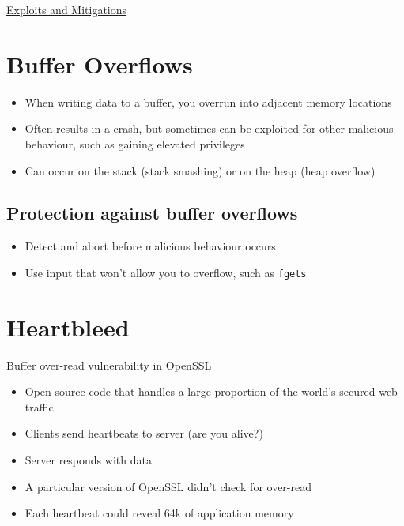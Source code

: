 \documentclass{article}[18pt]
\begin{document}
\begin{center}
\underline{\huge Exploits and Mitigations}
\end{center}

\section{Buffer Overflows}
\begin{itemize}
	\item When writing data to a buffer, you overrun into adjacent memory locations
	\item Often results in a crash, but sometimes can be exploited for other malicious behaviour, such as gaining elevated privileges
	\item Can occur on the stack (stack smashing) or on the heap (heap overflow)
\end{itemize}
\subsection{Protection against buffer overflows}
\begin{itemize}
	\item Detect and abort before malicious behaviour occurs
	\item Use input that won't allow you to overflow, such as \texttt{fgets}
\end{itemize}
\section{Heartbleed}
Buffer over-read vulnerability in OpenSSL
\begin{itemize}
	\item Open source code that handles a large proportion of the world's secured web traffic
	\item Clients send heartbeats to server (are you alive?)
	\item Server responds with data
	\item A particular version of OpenSSL didn't check for over-read
	\item Each heartbeat could reveal 64k of application memory
\end{itemize}
\end{document}
